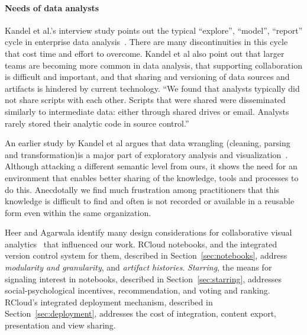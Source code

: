 \paragraph*{Needs of data analysts}
Kandel et al.'s interview study points out the typical ``explore'',
``model'', ``report'' cycle in enterprise data
analysis~\cite{Kandel:2012:EDA}. There are many discontinuities in
this cycle that cost time and effort to overcome.
Kandel et al also point out that larger teams
are becoming more common in data analysis, that supporting
collaboration is difficult and important, and that sharing
and versioning of data sources and artifacts is hindered by current
technology. ``We found that analysts typically did not
share scripts with each other. Scripts that were shared were
disseminated similarly to intermediate data: either through shared
drives or email. Analysts rarely stored their analytic code in source
control.''

An earlier study by Kandel et al argues that data wrangling
(cleaning, parsing and transformation)is a major part of exploratory
analysis and visualization~\cite{Kandel:2011:RDI}.
Although attacking a different semantic level from ours, it shows
the need for an environment that enables better sharing
of the knowledge, tools and processes to do this. Anecdotally
we find much frustration among practitioners that this knowledge
is difficult to find and often is not recorded or available in a
reusable form even within the same organization.

Heer and Agarwala identify many design considerations for
collaborative visual analytics~\cite{Heer:2008:DCF} that
influenced our work.
RCloud notebooks, and the integrated version control system for them,
described in Section~\ref{sec:notebooks}, address {\it modularity and
granularity}, and {\it artifact histories}.
\emph{Starring}, the means for signaling interest in notebooks, described in
Section~\ref{sec:starring}, addresses social-psychological incentives,
recommendation, and voting and ranking. RCloud's integrated deployment
mechanism, described in Section~\ref{sec:deployment}, addresses the cost of
integration, content export, presentation and view sharing.


